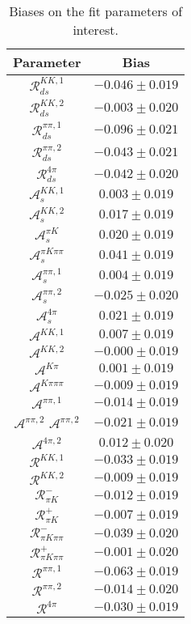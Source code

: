 \begin{table}
  \centering
  \small
  \begin{tabular}{cc}
  \toprule
      Parameter & Bias \\
  \midrule
      $\mathcal{R}_{ds}^{KK,1}$ & $-0.046 \pm 0.019$ \\
      $\mathcal{R}_{ds}^{KK,2}$ & $-0.003 \pm 0.020$ \\
      $\mathcal{R}_{ds}^{\pi\pi,1}$ & $-0.096 \pm 0.021$ \\
      $\mathcal{R}_{ds}^{\pi\pi,2}$ & $-0.043 \pm 0.021$ \\
      $\mathcal{R}_{ds}^{4\pi}$ & $-0.042 \pm 0.020$ \\
      $\mathcal{A}_s^{KK,1}$ & $0.003 \pm 0.019$ \\
      $\mathcal{A}_s^{KK,2}$ & $0.017 \pm 0.019$ \\
      $\mathcal{A}_s^{\pi K}$ & $0.020 \pm 0.019$ \\
      $\mathcal{A}_s^{\pi K\pi\pi}$ & $0.041 \pm 0.019$ \\
      $\mathcal{A}_s^{\pi\pi,1}$ & $0.004 \pm 0.019$ \\
      $\mathcal{A}_s^{\pi\pi,2}$ & $-0.025 \pm 0.020$ \\
      $\mathcal{A}_s^{4\pi}$ & $0.021 \pm 0.019$ \\
      $\mathcal{A}^{KK,1}$ & $0.007 \pm 0.019$ \\
      $\mathcal{A}^{KK,2}$ & $-0.000 \pm 0.019$ \\
      $\mathcal{A}^{K\pi}$ & $0.001 \pm 0.019$ \\
      $\mathcal{A}^{K\pi\pi\pi}$ & $-0.009 \pm 0.019$ \\
      $\mathcal{A}^{\pi\pi,1}$ & $-0.014 \pm 0.019$ \\
      $\mathcal{A}^{\pi\pi,2}$
$\mathcal{A}^{\pi\pi,2}$ & $-0.021 \pm 0.019$ \\
      $\mathcal{A}^{4\pi,2}$ & $0.012 \pm 0.020$ \\
      $\mathcal{R}^{KK,1}$ & $-0.033 \pm 0.019$ \\
      $\mathcal{R}^{KK,2}$ & $-0.009 \pm 0.019$ \\
      $\mathcal{R}_{\pi K}^-$ & $-0.012 \pm 0.019$ \\
      $\mathcal{R}_{\pi K}^+$ & $-0.007 \pm 0.019$ \\
      $\mathcal{R}_{\pi K\pi\pi}^-$ & $-0.039 \pm 0.020$ \\
      $\mathcal{R}_{\pi K\pi\pi}^+$ & $-0.001 \pm 0.020$ \\
      $\mathcal{R}^{\pi\pi,1}$ & $-0.063 \pm 0.019$ \\
      $\mathcal{R}^{\pi\pi,2}$ & $-0.014 \pm 0.020$ \\
      $\mathcal{R}^{4\pi}$ & $-0.030 \pm 0.019$ \\
      \bottomrule
  \end{tabular}
  \caption{Biases on the fit parameters of interest.}
\label{tab:biases}
\end{table}
